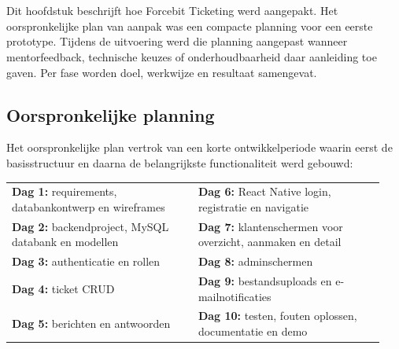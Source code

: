 
\chapter{}%
\label{ch:methodologie}

Dit hoofdstuk beschrijft hoe Forcebit Ticketing werd aangepakt. Het oorspronkelijke plan van aanpak was een compacte planning voor een eerste prototype. Tijdens de uitvoering werd die planning aangepast wanneer mentorfeedback, technische keuzes of onderhoudbaarheid daar aanleiding toe gaven. Per fase worden doel, werkwijze en resultaat samengevat.

\section{Oorspronkelijke planning}

Het oorspronkelijke plan vertrok van een korte ontwikkelperiode waarin eerst de basisstructuur en daarna de belangrijkste functionaliteit werd gebouwd:

\begin{center}
\footnotesize
\begin{tabular}{@{}p{0.47\linewidth}p{0.47\linewidth}@{}}
\textbf{Dag 1:} requirements, databankontwerp en wireframes & \textbf{Dag 6:} React Native login, registratie en navigatie \\
\textbf{Dag 2:} backendproject, MySQL databank en modellen & \textbf{Dag 7:} klantenschermen voor overzicht, aanmaken en detail \\
\textbf{Dag 3:} authenticatie en rollen & \textbf{Dag 8:} adminschermen \\
\textbf{Dag 4:} ticket CRUD & \textbf{Dag 9:} bestandsuploads en e-mailnotificaties \\
\textbf{Dag 5:} berichten en antwoorden & \textbf{Dag 10:} testen, fouten oplossen, documentatie en demo
\end{tabular}
\end{center}

